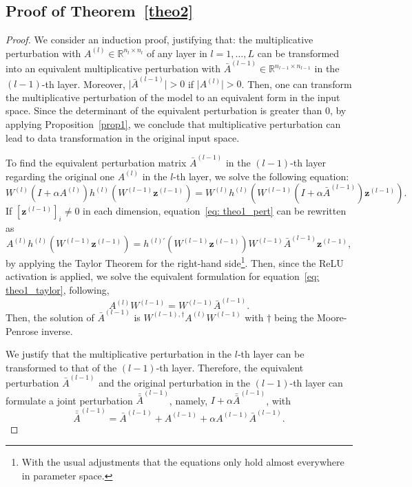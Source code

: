 \documentclass{article} \usepackage{iclr2022_conference,times}
\def\eqref#1{equation~\ref{#1}}
\begin{document}
\subsection{Proof of Theorem~\ref{theo2}} \label{app: proof2}
\begin{proof}
We consider an induction proof, justifying that: the multiplicative perturbation with $A^{(l)}\in\mathbb{R}^{n_l\times n_l}$ of any layer in $l=1,\ldots,L$ can be transformed into an equivalent multiplicative perturbation with $\bar{A}^{(l-1)}\in\mathbb{R}^{n_{l-1}\times n_{l-1}}$ in the $(l-1)$-th layer. Moreover, $\lvert\bar{A}^{(l-1)}\rvert>0$ if $\lvert A^{(l)}\rvert>0$. Then, one can transform the multiplicative perturbation of the model to an equivalent form in the input space. Since the determinant of the equivalent perturbation is greater than 0, by applying Proposition~\ref{prop1}, we conclude that multiplicative perturbation can lead to data transformation in the original input space. 

To find the equivalent perturbation matrix $\bar{A}^{(l-1)}$ in the $(l-1)$-th layer regarding the original one $A^{(l)}$ in the $l$-th layer, we solve the following equation:
\begin{equation}
W^{(l)}(I+\alpha A^{(l)}) h^{(l)}(W^{(l-1)}\boldsymbol{z}^{(l-1)})= W^{(l)}h^{(l)}(W^{(l-1)} (I+\alpha \bar{A}^{(l-1)})\boldsymbol{z}^{(l-1)}). \label{eq: theo1_pert}
\end{equation}
If $ [\boldsymbol{z}^{(l-1)}]_i\ne0$ in each dimension, \eqref{eq: theo1_pert} can be rewritten as
\begin{equation}
A^{(l)}h^{(l)}(W^{(l-1)}\boldsymbol{z}^{(l-1)}) = h^{(l)'}(W^{(l-1)}\boldsymbol{z}^{(l-1)}) W^{(l-1)}\bar{A}^{(l-1)}\boldsymbol{z}^{(l-1)},\label{eq: theo1_taylor}
\end{equation}
by applying the Taylor Theorem for the right-hand side\footnote{With the usual adjustments that the equations only hold almost everywhere in parameter space.}. Then, since the ReLU activation is applied, we solve the equivalent formulation for \eqref{eq: theo1_taylor}, following, 
\begin{equation}
    A^{(l)}W^{(l-1)}=W^{(l-1)}\bar{A}^{(l-1)}.
\end{equation}
Then, the solution of $\bar{A}^{(l-1)}$ is $W^{(l-1),\dagger}A^{(l)}W^{(l-1)}$ with $\dagger$ being the Moore-Penrose inverse.  

We justify that the multiplicative perturbation in the $l$-th layer can be transformed to that of the $(l-1)$-th layer. Therefore, the equivalent perturbation $\bar{A}^{(l-1)}$ and the original perturbation in the $(l-1)$-th layer can formulate a joint perturbation $\bar{\bar{A}}^{(l-1)}$, namely, $I+\alpha \bar{\bar{A}}^{(l-1)}$, with 
\begin{equation}
 \bar{\bar{A}}^{(l-1)}=\bar{A}^{(l-1)}+{A}^{(l-1)}+\alpha {A}^{(l-1)}\bar{A}^{(l-1)}.
\end{equation}


\end{proof}
\end{document}
